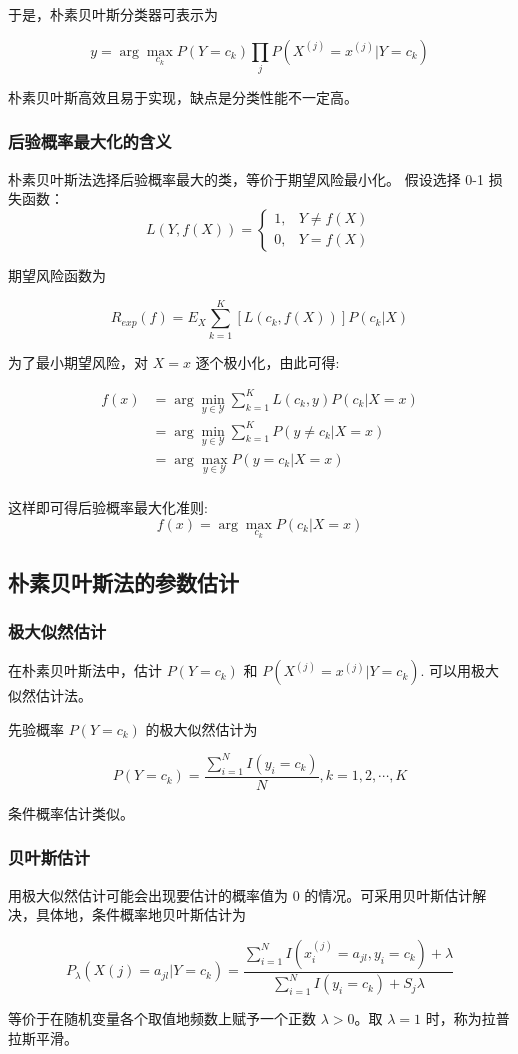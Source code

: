 \documentclass{ctexart}
\begin{document}
于是，朴素贝叶斯分类器可表示为

\[
    y = \arg \mathop{\max}_{c_k}{P(Y=c_k)\prod_{j}P\left(X^{(j)} = x^{(j)} | Y = c_k\right)}
\]

朴素贝叶斯高效且易于实现，缺点是分类性能不一定高。

\subsubsection{后验概率最大化的含义}
朴素贝叶斯法选择后验概率最大的类，等价于期望风险最小化。
假设选择 0-1 损失函数：
\[
    L(Y,f(X)) = \begin{cases}
        1, & Y \neq  f(X) \\
        0, & Y = f(X)
    \end{cases}
\]

期望风险函数为

\[
    R_{exp}(f) = E_X\sum_{k=1}^K[L(c_k,f(X))]P(c_k|X)
\]

为了最小期望风险，对 $X=x$ 逐个极小化，由此可得:

\[
    \begin{aligned}
        f(x) &= \arg \mathop{\min}_{y \in \mathcal{Y} } \sum_{k=1}^K L(c_k,y)P(c_k | X = x)\\
             &= \arg \mathop{\min}_{y \in \mathcal{Y} } \sum_{k=1}^K P(y \neq c_k | X = x)  \\
             &= \arg \mathop{\max}_{y \in \mathcal{Y} } P(y=c_k | X = x) \\
    \end{aligned}
\]

这样即可得后验概率最大化准则:
\[
    f(x) = \arg \mathop{\max}_{c_k} P(c_k | X = x)
\]

\subsection{朴素贝叶斯法的参数估计}

\subsubsection{极大似然估计}

在朴素贝叶斯法中，估计 $P(Y=c_k)$ 和 $P(X^{(j)} = x^{(j)} | Y = c_k)$. 可以用极大似然估计法。

先验概率 $P(Y=c_k)$ 的极大似然估计为

\[
    P(Y=c_k) = \frac{\sum_{i=1}^NI(y_i=c_k)}{N},  k = 1,2, \cdots,K
\]

条件概率估计类似。

\subsubsection{贝叶斯估计}

用极大似然估计可能会出现要估计的概率值为 0 的情况。可采用贝叶斯估计解决，具体地，条件概率地贝叶斯估计为

\[
    P_{\lambda}(X{(j)} = a_{jl} | Y = c_k) = \frac{\sum_{i=1}^N I(x_i^{(j)} = a_{jl},y_i=c_k) + \lambda}{\sum_{i=1}^NI(y_i=c_k) + S_j\lambda}
\]


等价于在随机变量各个取值地频数上赋予一个正数 $\lambda > 0$。取 $\lambda = 1$ 时，称为拉普拉斯平滑。
\end{document}
